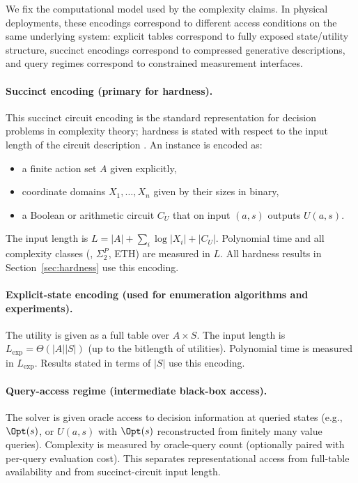 We fix the computational model used by the complexity claims.
In physical deployments, these encodings correspond to different access conditions on the same underlying system: explicit tables correspond to fully exposed state/utility structure, succinct encodings correspond to compressed generative descriptions, and query regimes correspond to constrained measurement interfaces.

\paragraph{Succinct encoding (primary for hardness).}
This succinct circuit encoding is the standard representation for decision problems in complexity theory; hardness is stated with respect to the input length of the circuit description \cite{arora2009computational,papadimitriou1994complexity}.
An instance is encoded as:
\begin{itemize}
\item a finite action set $A$ given explicitly,
\item coordinate domains $X_1,\ldots,X_n$ given by their sizes in binary,
\item a Boolean or arithmetic circuit $C_U$ that on input $(a,s)$ outputs $U(a,s)$.
\end{itemize}
The input length is $L = |A| + \sum_i \log |X_i| + |C_U|$. Polynomial time and all complexity classes (\coNP, $\Sigma_2^P$, ETH) are measured in $L$. All hardness results in Section~\ref{sec:hardness} use this encoding.

\paragraph{Explicit-state encoding (used for enumeration algorithms and experiments).}
The utility is given as a full table over $A \times S$. The input length is $L_{\text{exp}} = \Theta(|A||S|)$ (up to the bitlength of utilities). Polynomial time is measured in $L_{\text{exp}}$. Results stated in terms of $|S|$ use this encoding.

\paragraph{Query-access regime (intermediate black-box access).}
The solver is given oracle access to decision information at queried states (e.g., $\Opt(s)$, or $U(a,s)$ with $\Opt(s)$ reconstructed from finitely many value queries). Complexity is measured by oracle-query count (optionally paired with per-query evaluation cost). This separates representational access from full-table availability and from succinct-circuit input length.

